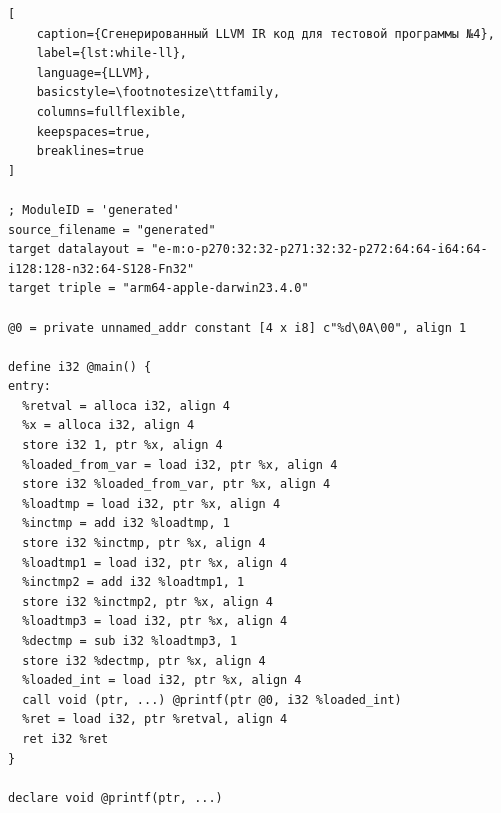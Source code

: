 \begin{lstlisting}[
    caption={Сгенерированный LLVM IR код для тестовой программы №4},
    label={lst:while-ll},
    language={LLVM},
    basicstyle=\footnotesize\ttfamily,
    columns=fullflexible,
    keepspaces=true,
    breaklines=true
]

; ModuleID = 'generated'
source_filename = "generated"
target datalayout = "e-m:o-p270:32:32-p271:32:32-p272:64:64-i64:64-i128:128-n32:64-S128-Fn32"
target triple = "arm64-apple-darwin23.4.0"

@0 = private unnamed_addr constant [4 x i8] c"%d\0A\00", align 1

define i32 @main() {
entry:
  %retval = alloca i32, align 4
  %x = alloca i32, align 4
  store i32 1, ptr %x, align 4
  %loaded_from_var = load i32, ptr %x, align 4
  store i32 %loaded_from_var, ptr %x, align 4
  %loadtmp = load i32, ptr %x, align 4
  %inctmp = add i32 %loadtmp, 1
  store i32 %inctmp, ptr %x, align 4
  %loadtmp1 = load i32, ptr %x, align 4
  %inctmp2 = add i32 %loadtmp1, 1
  store i32 %inctmp2, ptr %x, align 4
  %loadtmp3 = load i32, ptr %x, align 4
  %dectmp = sub i32 %loadtmp3, 1
  store i32 %dectmp, ptr %x, align 4
  %loaded_int = load i32, ptr %x, align 4
  call void (ptr, ...) @printf(ptr @0, i32 %loaded_int)
  %ret = load i32, ptr %retval, align 4
  ret i32 %ret
}

declare void @printf(ptr, ...)


\end{lstlisting}



